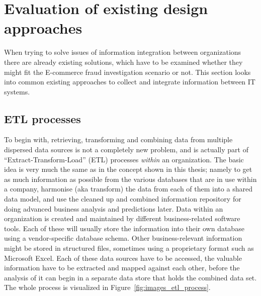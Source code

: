 
\section{Evaluation of existing design approaches}
\label{sec:system_approaches}

When trying to solve issues of information integration between organizations there are already existing solutions, which have to be examined whether they might fit the \gls{E-commerce} fraud investigation scenario or not. This section looks into common existing approaches to collect and integrate information between \gls{IT} systems.

\subsection{\gls{ETL} processes}
\label{subsec:etl_process}

To begin with, retrieving, transforming and combining data from multiple dispersed data sources is not a completely new problem, and is actually part of ``Extract-Transform-Load'' (\gls{ETL}) processes \emph{within} an organization. The basic idea is very much the same as in the concept shown in this thesis; namely to get as much information as possible from the various databases that are in use within a company, harmonise (aka transform) the data from each of them into a shared data model, and use the cleaned up and combined information repository for doing advanced business analysis and predictions later. Data within an organization is created and maintained by different business-related software tools. Each of these will usually store the information into their own database using a vendor-specific database schema. Other business-relevant information might be stored in structured files, sometimes using a proprietary format such as Microsoft Excel. Each of these data sources have to be accessed, the valuable information have to be extracted and mapped against each other, before the analysis of it can begin in a separate data store that holds the combined data set. The whole process is visualized in Figure~\ref{fig:images_etl_process}. \@

